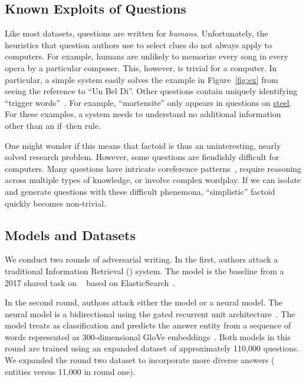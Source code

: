\subsection{Known Exploits of \qb{} Questions}
\label{subsec:exploits}

Like most  datasets, \qb{} questions are
written for \emph{humans}. Unfortunately, the heuristics that
question authors use to select clues do not always apply to
computers. For example, humans are unlikely to memorize every song in
every opera by a particular composer. This, however, is trivial for a
computer. In particular, a simple  system easily
solves the example in Figure~\ref{fig:ex} from seeing the reference to
``Un Bel Di''. Other questions contain uniquely identifying ``trigger
words''~\cite{harris2006prisoner}. For example, ``martensite'' only appears in questions on
\underline{steel}. For these examples, a  system needs
to understand no additional information other than an if--then rule.

One might wonder if this means that factoid  is thus an
uninteresting, nearly solved research problem.  However, some \qb{}
questions are fiendishly difficult for computers. Many questions have
intricate coreference patterns~\cite{guha15coref}, require reasoning
across multiple types of knowledge, or involve complex wordplay. If we can
isolate and generate questions with these difficult phenemona,
``simplistic'' factoid  quickly becomes non-trivial.

\subsection{Models and Datasets}
\label{subsec:models}

We conduct two rounds of adversarial writing. In the first, authors
attack a traditional Information Retrieval () system.
The  model is the baseline from
a  2017 shared task on \qb{}~\cite{boydgraber2018nips} based on ElasticSearch~\cite{gormley2015elasticsearch}.

In the second round, authors attack either the  model or
a neural  model. The neural model is 
a bidirectional  using
the gated recurrent unit architecture~\cite{cho2014gru}.
The model treats \qb{} as classification and predicts the answer entity from a sequence of words
represented as 300-dimensional GloVe
embeddings~\cite{pennington2014glove}. Both models
in this round are trained using an expanded dataset of 
approximately 110,000 \qb{} questions. We expanded the round two 
dataset to incorporate more diverse answers (\nansweroptions{} entities
versus 11,000 in round one).

